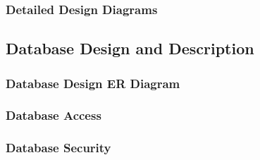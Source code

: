 \documentclass{article}
\begin{document}
\subsubsection{Detailed Design Diagrams}
\label{ddd}


\pagebreak
\subsection{Database Design and Description}

\subsubsection{Database Design ER Diagram}
\label{dded}

\subsubsection{Database Access}
\label{da}

\subsubsection{Database Security}
\label{ds}

\end{document}
